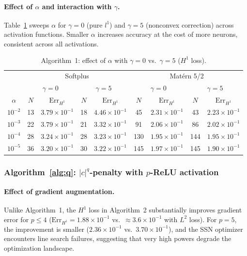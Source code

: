 \documentclass[12pt,fleqn]{amsart}
\theoremstyle{definition}
\begin{document}
\paragraph{\textbf{Effect of $\alpha$ and interaction with $\gamma$.}}
Table~\ref{tab:alg1_alpha} sweeps $\alpha$ for $\gamma = 0$ (pure $l^1$) and $\gamma = 5$ (nonconvex correction) across activation functions.
Smaller $\alpha$ increases accuracy at the cost of more neurons, consistent across all activations.

\begin{table}[H]
\centering
\caption{Algorithm~1: effect of $\alpha$ with $\gamma = 0$ vs.\ $\gamma = 5$ ($H^1$ loss).}
\label{tab:alg1_alpha}
\begin{tabular}{c|cc|cc|cc|cc}
\hline
 & \multicolumn{4}{c|}{Softplus} & \multicolumn{4}{c}{Mat\'ern 5/2} \\
 & \multicolumn{2}{c|}{$\gamma = 0$} & \multicolumn{2}{c|}{$\gamma = 5$} & \multicolumn{2}{c|}{$\gamma = 0$} & \multicolumn{2}{c}{$\gamma = 5$} \\
$\alpha$ & $N$ & $\mathrm{Err}_{H^1}$ & $N$ & $\mathrm{Err}_{H^1}$ & $N$ & $\mathrm{Err}_{H^1}$ & $N$ & $\mathrm{Err}_{H^1}$ \\
\hline
$10^{-2}$ & 13 & $3.79 \times 10^{-1}$ & 18 & $4.46 \times 10^{-1}$ & 45 & $2.31 \times 10^{-1}$ & 43 & $2.23 \times 10^{-1}$ \\
$10^{-3}$ & 22 & $3.79 \times 10^{-1}$ & 21 & $3.32 \times 10^{-1}$ & 91 & $2.06 \times 10^{-1}$ & 86 & $2.02 \times 10^{-1}$ \\
$10^{-4}$ & 28 & $3.24 \times 10^{-1}$ & 28 & $3.23 \times 10^{-1}$ & 130 & $1.95 \times 10^{-1}$ & 144 & $1.95 \times 10^{-1}$ \\
$10^{-5}$ & 36 & $3.20 \times 10^{-1}$ & 30 & $3.22 \times 10^{-1}$ & 145 & $1.97 \times 10^{-1}$ & 145 & $1.90 \times 10^{-1}$ \\
\hline
\end{tabular}
\end{table}


\subsubsection*{Algorithm~\ref{alg:q}: $|c|^q$-penalty with $p$-ReLU activation}

\paragraph{\textbf{Effect of gradient augmentation.}}
Unlike Algorithm~1, the $H^1$ loss in Algorithm~2 substantially improves gradient error for $p \leqslant 4$ ($\mathrm{Err}_{H^1} = 1.88 \times 10^{-1}$ vs.\ $\approx 3.6 \times 10^{-1}$ with $L^2$ loss).
For $p = 5$, the improvement is smaller ($2.36 \times 10^{-1}$ vs.\ $3.70 \times 10^{-1}$), and the SSN optimizer encounters line search failures, suggesting that very high powers degrade the optimization landscape.
\end{document}
